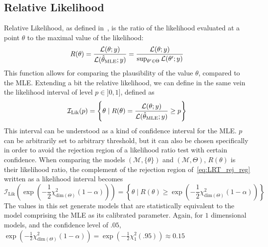 \documentclass[../../Main_ManuscritThese.tex]{subfiles}
\begin{document}
\subsection{Relative Likelihood}
\label{sec:relative_likelihood}
Relative Likelihood, as defined in~\cite{kalbfleisch_probability_1985}, is the ratio of the likelihood evaluated at a point $\theta$ to the maximal value of the likelihood:
\begin{equation}
  R(\theta) = \frac{\mathcal{L}(\theta;y)}{\mathcal{L}(\hat{\theta}_{\mathrm{MLE}};y)} = \frac{\mathcal{L}(\theta;y)}{\sup_{\theta^{\prime} \in \Theta}\mathcal{L}(\theta^{\prime};y)}
\end{equation}
This function allows for comparing the plausibility of the value $\theta$, compared to the MLE.
Extending a bit the relative likelihood, we can define in the same vein the likelihood interval of level $p\in ]0,1]$, defined as
\begin{equation}
  \mathcal{I}_{\mathrm{Lik}}(p) = \left\{\theta \mid R(\theta)=\frac{\mathcal{L}(\theta;y)}{\mathcal{L}(\hat{\theta}_{\mathrm{MLE}};y)} \geq p\right\}
\end{equation}
This interval can be understood as a kind of confidence interval for the MLE. $p$ can be arbitrarily set to arbitrary threshold, but it can also be chosen specifically in order to avoid the rejection region of a likelihood ratio test with certain confidence. When comparing the models $(\mathcal{M}, \{\theta\})$ and $(\mathcal{M},\Theta)$, $R(\theta)$ is their likelihood ratio, the complement of the rejection region of~\cref{eq:LRT_rej_reg} written as a likelihood interval becomes
\begin{equation}
 \mathcal{I}_{\mathrm{Lik}}\left(\exp\left(-\frac{1}{2}\chi^2_{\mathrm{dim}(\Theta)}(1-\alpha)\right)\right) = \left\{\theta \mid R(\theta) \geq \exp\left(-\frac{1}{2}\chi^2_{\mathrm{dim}(\Theta)}(1-\alpha)\right) \right\}
\end{equation}
The values in this set generate models that are statistically equivalent to the model comprising the MLE as its calibrated parameter. Again, for $1$ dimensional models, and the confidence level of $.05$, $\exp\left(-\frac{1}{2}\chi^2_{\mathrm{dim}(\Theta)}(1-\alpha)\right) = \exp\left(-\frac{1}{2}\chi^2_{1}(.95)\right) \approx 0.15$
\end{document}
